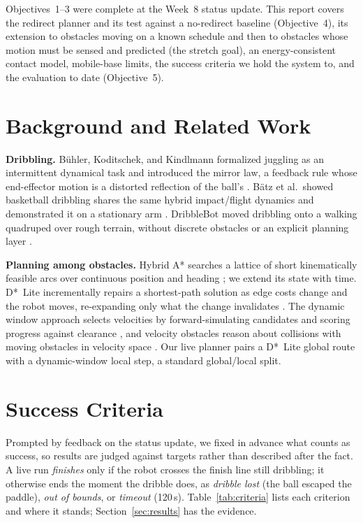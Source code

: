 \documentclass[10pt,twocolumn]{article}
\begin{document}
Objectives~1--3 were complete at the Week~8 status update. This report
covers the redirect planner and its test against a no-redirect baseline
(Objective~4), its extension to obstacles moving on a known schedule and
then to obstacles whose motion must be sensed and predicted (the stretch
goal), an energy-consistent contact model, mobile-base limits, the success
criteria we hold the system to, and the evaluation to date (Objective~5).

\section{Background and Related Work}
\textbf{Dribbling.} Bühler, Koditschek, and Kindlmann formalized juggling
as an intermittent dynamical task and introduced the mirror law, a
feedback rule whose end-effector motion is a distorted reflection of the
ball's \cite{buehler1994}. Bätz et al.\ showed basketball dribbling shares
the same hybrid impact/flight dynamics and demonstrated it on a
stationary arm \cite{batz2009,batz2009icra}. DribbleBot moved dribbling
onto a walking quadruped over rough terrain, without discrete obstacles or
an explicit planning layer \cite{dribblebot2023}.

\textbf{Planning among obstacles.} Hybrid A* searches a lattice of short
kinematically feasible arcs over continuous position and heading
\cite{dolgov2010}; we extend its state with time. D*~Lite incrementally
repairs a shortest-path solution as edge costs change and the robot
moves, re-expanding only what the change invalidates \cite{koenig2002}.
The dynamic window approach selects velocities by forward-simulating
candidates and scoring progress against clearance \cite{fox1997}, and
velocity obstacles reason about collisions with moving obstacles in
velocity space \cite{fiorini1998}. Our live planner pairs a D*~Lite global
route with a dynamic-window local step, a standard global/local split.

\section{Success Criteria}
\label{sec:criteria}
Prompted by feedback on the status update, we fixed in advance what
counts as success, so results are judged against targets rather than
described after the fact. A live run \emph{finishes} only if the robot
crosses the finish line still dribbling; it otherwise ends the moment the
dribble does, as \emph{dribble lost} (the ball escaped the paddle),
\emph{out of bounds}, or \emph{timeout} (120\,s).
Table~\ref{tab:criteria} lists each criterion and where it stands;
Section~\ref{sec:results} has the evidence.
\end{document}
